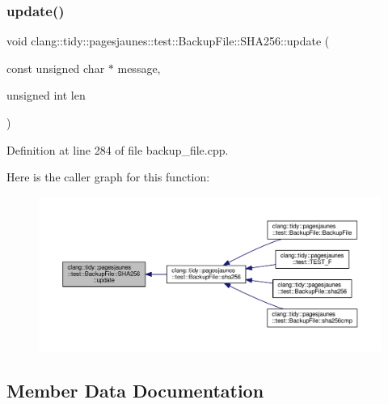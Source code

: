 \subsubsection{\texorpdfstring{update()}{update()}}
{\footnotesize\ttfamily void clang\+::tidy\+::pagesjaunes\+::test\+::\+Backup\+File\+::\+S\+H\+A256\+::update (\begin{DoxyParamCaption}\item[{const unsigned char $\ast$}]{message,  }\item[{unsigned int}]{len }\end{DoxyParamCaption})}



Definition at line 284 of file backup\+\_\+file.\+cpp.

Here is the caller graph for this function\+:
\nopagebreak
\begin{figure}[H]
\begin{center}
\leavevmode
\includegraphics[width=350pt]{classclang_1_1tidy_1_1pagesjaunes_1_1test_1_1_backup_file_1_1_s_h_a256_acda3e7e2e990f3f2662be522dbcf5157_icgraph}
\end{center}
\end{figure}


\subsection{Member Data Documentation}
\mbox{\label{classclang_1_1tidy_1_1pagesjaunes_1_1test_1_1_backup_file_1_1_s_h_a256_a45cb3f952719c0ac45c4cda10dc7fa85}} 
